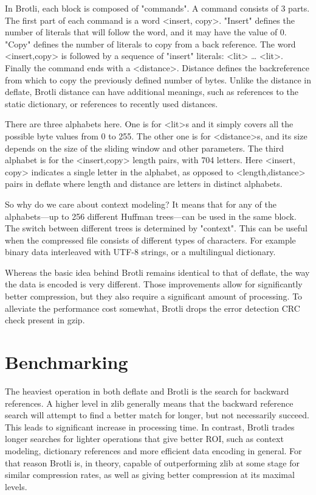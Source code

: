 \documentclass[12pt]{article}
\begin{document}
In Brotli, each block is composed of "commands". A command consists of 3
parts. The first part of each command is a word <insert, copy>. "Insert"
defines the number of literals that will follow the word, and it may
have the value of 0. "Copy" defines the number of literals to copy from
a back reference. The word <insert,copy> is followed by a sequence of
"insert" literals: <lit> … <lit>. Finally the command ends with a
<distance>. Distance defines the backreference from which to copy the
previously defined number of bytes. Unlike the distance in deflate,
Brotli distance can have additional meanings, such as references to the
static dictionary, or references to recently used distances.

There are three alphabets here. One is for <lit>s and it simply covers
all the possible byte values from 0 to 255. The other one is for
<distance>s, and its size depends on the size of the sliding window and
other parameters. The third alphabet is for the <insert,copy> length
pairs, with 704 letters. Here <insert, copy> indicates a single letter
in the alphabet, as opposed to <length,distance> pairs in deflate where
length and distance are letters in distinct alphabets.

So why do we care about context modeling? It means that for any of the
alphabets—up to 256 different Huffman trees—can be used in the same
block. The switch between different trees is determined by "context".
This can be useful when the compressed file consists of different types
of characters. For example binary data interleaved with UTF-8 strings,
or a multilingual dictionary.

Whereas the basic idea behind Brotli remains identical to that of
deflate, the way the data is encoded is very different. Those
improvements allow for significantly better compression, but they also
require a significant amount of processing. To alleviate the performance
cost somewhat, Brotli drops the error detection CRC check present in
gzip.

\section{Benchmarking}

The heaviest operation in both deflate and Brotli is the search for
backward references. A higher level in zlib generally means that the
backward reference search will attempt to find a better match for
longer, but not necessarily succeed. This leads to significant increase
in processing time. In contrast, Brotli trades longer searches for
lighter operations that give better ROI, such as context modeling,
dictionary references and more efficient data encoding in general. For
that reason Brotli is, in theory, capable of outperforming zlib at some
stage for similar compression rates, as well as giving better
compression at its maximal levels.
\end{document}
